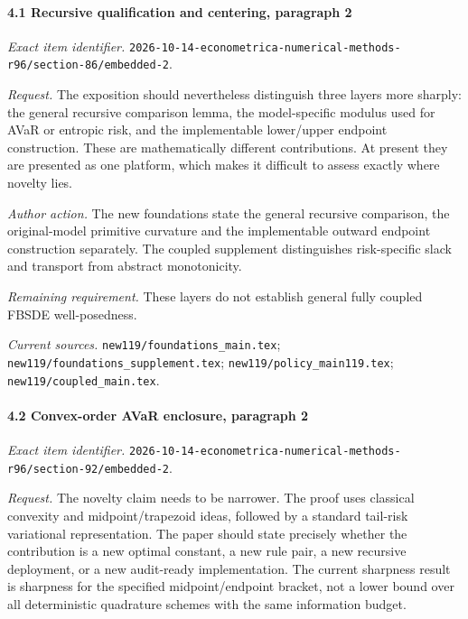 \paragraph{4.1 Recursive qualification and centering, paragraph 2}

\emph{Exact item identifier.} \nolinkurl{2026-10-14-econometrica-numerical-methods-r96/section-86/embedded-2}.

\par\emph{Request.} The exposition should nevertheless distinguish three layers more sharply: the general recursive comparison lemma, the model-specific modulus used for AVaR or entropic risk, and the implementable lower/\allowbreak{}upper endpoint construction. These are mathematically different contributions. At present they are presented as one platform, which makes it difficult to assess exactly where novelty lies.

\par\emph{Author action.} The new foundations state the general recursive comparison, the original-model primitive curvature and the implementable outward endpoint construction separately. The coupled supplement distinguishes risk-specific slack and transport from abstract monotonicity.

\par\emph{Remaining requirement.} These layers do not establish general fully coupled FBSDE well-posedness.

\par\emph{Current sources.} \nolinkurl{new119/foundations_main.tex}; \nolinkurl{new119/foundations_supplement.tex}; \nolinkurl{new119/policy_main119.tex}; \nolinkurl{new119/coupled_main.tex}.

\paragraph{4.2 Convex-order AVaR enclosure, paragraph 2}

\emph{Exact item identifier.} \nolinkurl{2026-10-14-econometrica-numerical-methods-r96/section-92/embedded-2}.

\par\emph{Request.} The novelty claim needs to be narrower. The proof uses classical convexity and midpoint/\allowbreak{}trapezoid ideas, followed by a standard tail-risk variational representation. The paper should state precisely whether the contribution is a new optimal constant, a new rule pair, a new recursive deployment, or a new audit-ready implementation. The current sharpness result is sharpness for the specified midpoint/\allowbreak{}endpoint bracket, not a lower bound over all deterministic quadrature schemes with the same information budget.

